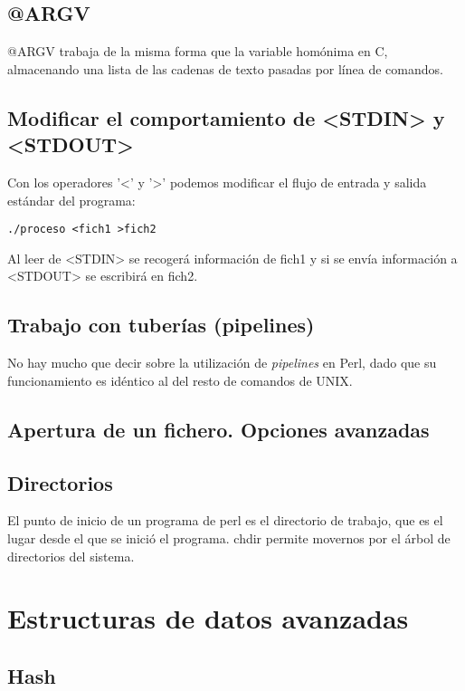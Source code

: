 \documentclass[12pt,a4paper]{memoir}
\begin{document}
	\section{@ARGV}
	@ARGV trabaja de la misma forma que la variable homónima en C, almacenando una lista de las cadenas de texto pasadas por línea de comandos.
	\section{Modificar el comportamiento de <STDIN> y <STDOUT>}
	Con los operadores '<' y '>' podemos modificar el flujo de entrada y salida estándar del programa:
	\lstset{language=Perl, showspaces=false}
	\begin{lstlisting}[frame=single, showspaces=false]
	./proceso <fich1 >fich2
	\end{lstlisting}
	Al leer de <STDIN> se recogerá información de fich1 y si se envía información a <STDOUT> se escribirá en fich2.
	\section{Trabajo con tuberías (pipelines)}
	No hay mucho que decir sobre la utilización de \textit{pipelines} en Perl, dado que su funcionamiento es idéntico al del resto de comandos de UNIX.
	\section{Apertura de un fichero. Opciones avanzadas}
	\section{Directorios}
	El punto de inicio de un programa de perl es el directorio de trabajo, que es el lugar desde el que se inició el programa. chdir permite movernos por el árbol de directorios del sistema.
	\chapter{Estructuras de datos avanzadas}
	\section{Hash}
\end{document}

